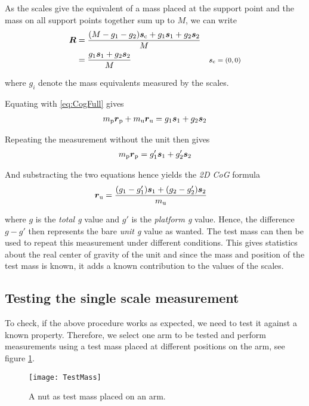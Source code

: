 \documentclass[journal]{IEEEtran}
\begin{document}
As the scales give the equivalent of a mass placed at the support point and the mass on all support points together sum up to $M$, we can write
\begin{align}
	\vec{R} & = \frac{(M - g_1 - g_2) \vec{s}_{\textup{c}} + g_1 \vec{s}_1 + g_2 \vec{s}_2}{M} \\
	& = \frac{g_1 \vec{s}_1 + g_2 \vec{s}_2}{M} & \comment{$\vec{s}_{\textup{c}} = (0,0)$}
\end{align}

where $g_i$ denote the mass equivalents measured by the scales.

Equating with \eqref{eq:CogFull} gives
\begin{align}
	m_{\textup{p}} \vec{r}_{\textup{p}} + m_{\textup{u}} \vec{r}_{\textup{u}} = g_1 \vec{s}_1 + g_2 \vec{s}_2
\end{align}

Repeating the measurement without the unit then gives
\begin{align}
	m_{\textup{p}} \vec{r}_{\textup{p}} = g_1' \vec{s}_1 + g_2' \vec{s}_2
\end{align}

And substracting the two equations hence yields the \emph{2D CoG} formula
\begin{align}
	\vec{r}_{\textup{u}} & =  \frac{(g_1 - g_1') \vec{s}_1 + (g_2 - g_2') \vec{s}_2}{m_{\textup{u}}}
	\label{eq:2DCoG}
\end{align}

where $g$ is the \emph{total g} value and $g'$ is the \emph{platform g} value. Hence, the difference $g-g'$ then represents the bare \emph{unit g} value as wanted.
The test mass can then be used to repeat this measurement under different conditions.
This gives statistics about the real center of gravity of the unit and since the mass and position of the test mass is known, it adds a known contribution to the values of the scales.

\subsection{Testing the single scale measurement}
\label{sec:SingleScale}

To check, if the above procedure works as expected, we need to test it against a known property.
Therefore, we select one arm to be tested and perform measurements using a test mass placed at different positions on the arm, see figure \ref{fig:TestMass}.

\begin{figure}[b]
	\centering
	\texttt{[image: TestMass]}
	\caption{A nut as test mass placed on an arm.}
	\label{fig:TestMass}
\end{figure}
\end{document}
